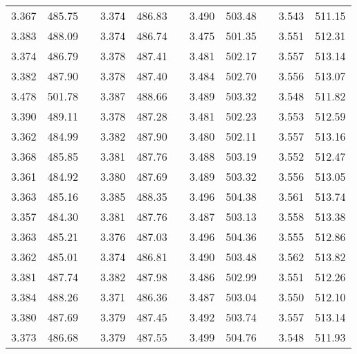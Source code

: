 \documentclass[12pt]{mwrep}
\begin{document}
\begin{table}[H]
\begin{tabularx}{\textwidth}{|Y|Z{16mm}|p{2mm}|Y|Z{16mm}|p{2mm}|Y|Z{16mm}|p{2mm}|Y|Z{16mm}|}
			3.367 & 485.75 && 3.374 & 486.83 && 3.490 & 503.48 && 3.543 & 511.15 \\
			3.383 & 488.09 && 3.374 & 486.74 && 3.475 & 501.35 && 3.551 & 512.31 \\
			3.374 & 486.79 && 3.378 & 487.41 && 3.481 & 502.17 && 3.557 & 513.14 \\
			3.382 & 487.90 && 3.378 & 487.40 && 3.484 & 502.70 && 3.556 & 513.07 \\
			3.478 & 501.78 && 3.387 & 488.66 && 3.489 & 503.32 && 3.548 & 511.82 \\
			3.390 & 489.11 && 3.378 & 487.28 && 3.481 & 502.23 && 3.553 & 512.59 \\
			3.362 & 484.99 && 3.382 & 487.90 && 3.480 & 502.11 && 3.557 & 513.16 \\
			3.368 & 485.85 && 3.381 & 487.76 && 3.488 & 503.19 && 3.552 & 512.47 \\
			3.361 & 484.92 && 3.380 & 487.69 && 3.489 & 503.32 && 3.556 & 513.05 \\
			3.363 & 485.16 && 3.385 & 488.35 && 3.496 & 504.38 && 3.561 & 513.74 \\
			3.357 & 484.30 && 3.381 & 487.76 && 3.487 & 503.13 && 3.558 & 513.38 \\
			3.363 & 485.21 && 3.376 & 487.03 && 3.496 & 504.36 && 3.555 & 512.86 \\
			3.362 & 485.01 && 3.374 & 486.81 && 3.490 & 503.48 && 3.562 & 513.82 \\
			3.381 & 487.74 && 3.382 & 487.98 && 3.486 & 502.99 && 3.551 & 512.26 \\
			3.384 & 488.26 && 3.371 & 486.36 && 3.487 & 503.04 && 3.550 & 512.10 \\
			3.380 & 487.69 && 3.379 & 487.45 && 3.492 & 503.74 && 3.557 & 513.14 \\
			3.373 & 486.68 && 3.379 & 487.55 && 3.499 & 504.76 && 3.548 & 511.93 \\

\end{tabularx}
\end{table}
\end{document}
